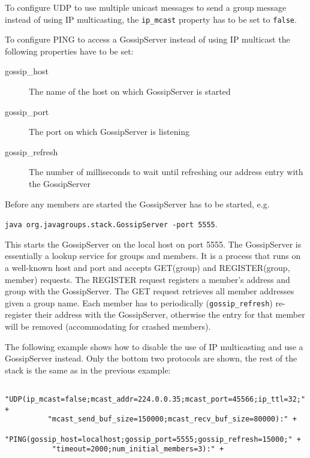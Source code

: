       To configure UDP to use multiple unicast messages to send a group message
      instead of using IP multicasting, the {\tt ip\_mcast} property has to be set to
      {\tt false}.

      To configure PING to access a GossipServer instead of using IP multicast the
      following properties have to be set:

      \begin{description}
      \item[gossip\_host] The name of the host on which GossipServer is started
      \item[gossip\_port] The port on which GossipServer is listening
      \item[gossip\_refresh] The number of milliseconds to wait until refreshing our
                             address entry with the GossipServer
      \end{description}

      Before any members are started the GossipServer has to be started, e.g.

      {\tt java org.javagroups.stack.GossipServer -port 5555}.

      This starts the GossipServer on the local host on port 5555. The GossipServer
      is essentially a lookup service for groups and members. It is a process that
      runs on a well-known host and port and accepts GET(group) and REGISTER(group,
      member) requests. The REGISTER request registers a member's address and group
      with the GossipServer. The GET request retrieves all member addresses given a
      group name. Each member has to periodically ({\tt gossip\_refresh}) re-register
      their address with the GossipServer, otherwise the entry for that member will be
      removed (accommodating for crashed members).

      The following example shows how to disable the use of IP multicasting and use a
      GossipServer instead. Only the bottom two protocols are shown, the rest of the
      stack is the same as in the previous example:

      \begin{small}
      \begin{verbatim}
      "UDP(ip_mcast=false;mcast_addr=224.0.0.35;mcast_port=45566;ip_ttl=32;" +
          "mcast_send_buf_size=150000;mcast_recv_buf_size=80000):" +
      "PING(gossip_host=localhost;gossip_port=5555;gossip_refresh=15000;" +
           "timeout=2000;num_initial_members=3):" +
      \end{verbatim}
      \end{small}

